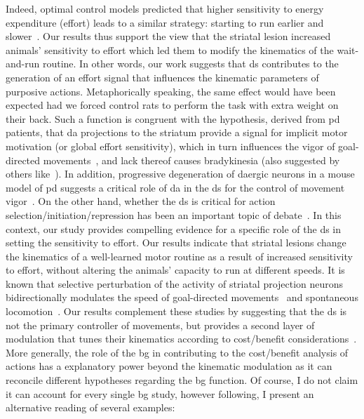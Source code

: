 Indeed, optimal control models predicted that higher sensitivity to energy expenditure (effort) leads to a similar strategy: starting to run earlier and slower~\cite{JuradoParras2020}.
Our results thus support the view that the striatal lesion increased animals' sensitivity to effort which led them to modify the kinematics of the wait-and-run routine.
In other words, our work suggests that \gls{ds} contributes to the generation of an effort signal that influences the kinematic parameters of purposive actions.
Metaphorically speaking, the same effect would have been expected had we forced control rats to perform the task with extra weight on their back.
Such a function is congruent with the hypothesis, derived from \gls{pd} patients, that \gls{da} projections to the striatum provide a signal for implicit motor motivation (or global effort sensitivity), which in turn influences the vigor of goal-directed movements~\cite{Mazzoni2007}, and lack thereof causes bradykinesia (also suggested by others like~\cite{Berke2018NN, Beeler2012Fron}).
In addition, progressive degeneration of \gls{da}ergic neurons in a mouse model of \gls{pd} suggests a critical role of \gls{da} in the \gls{ds} for the control of movement vigor~\cite{Panigrahi2015Cell}.
On the other hand, whether the \gls{ds} is critical for action selection/initiation/repression has been an important topic of debate~\cite{Turner2010CurrOpinNeurobiol, Dudman2016CurrOpinNeurobiol}.
In this context, our study provides compelling evidence for a specific role of the \gls{ds} in setting the sensitivity to effort.
Our results indicate that striatal lesions change the kinematics of a well-learned motor routine as a result of increased sensitivity to effort, without altering the animals' capacity to run at different speeds.
It is known that selective perturbation of the activity of striatal projection neurons bidirectionally modulates the speed of goal-directed movements~\cite{Yttri2016Nature} and spontaneous locomotion~\cite{Kravitz2010Nature}.
Our results complement these studies by suggesting that the \gls{ds} is not the primary controller of movements, but provides a second layer of modulation that tunes their kinematics according to cost/benefit considerations~\cite{Berke2018NN,Beeler2012Fron}.
More generally, the role of the \gls{bg} in contributing to the cost/benefit analysis of actions has a explanatory power beyond the kinematic modulation as it can reconcile different hypotheses regarding the \gls{bg} function.
Of course, I do not claim it can account for every single \gls{bg} study, however following, I present an alternative reading of several examples:
